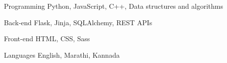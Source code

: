 

\begin{cvskills}

  \cvskill
    {Programming} %
    {Python, JavaScript, C++, Data structures and algorithms} %

  \cvskill
    {Back-end} %
    {Flask, Jinja, SQLAlchemy, REST APIs} %

  \cvskill
    {Front-end} %
    {HTML, CSS, Sass} %


  \cvskill
    {Languages} %
    {English, Marathi, Kannada} %

\end{cvskills}
